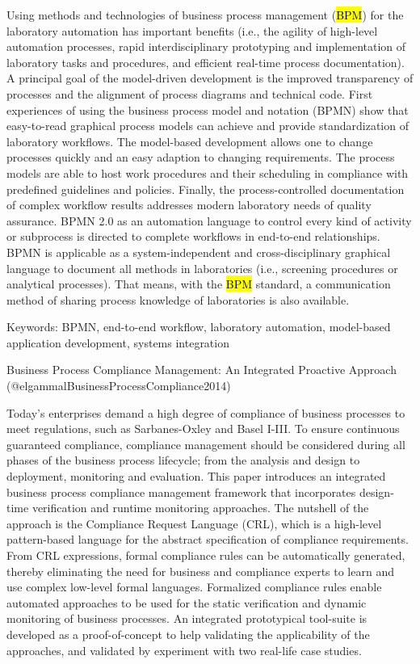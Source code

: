 \documentclass[
  letterpaper,
  DIV=11,
  numbers=noendperiod]{scrartcl}
\begin{document}
Using methods and technologies of business process management (\hl{BPM})
for the laboratory automation has important benefits (i.e., the agility
of high-level automation processes, rapid interdisciplinary prototyping
and implementation of laboratory tasks and procedures, and efficient
real-time process documentation). A principal goal of the model-driven
development is the improved transparency of processes and the alignment
of process diagrams and technical code. First experiences of using the
business process model and notation (BPMN) show that easy-to-read
graphical process models can achieve and provide standardization of
laboratory workflows. The model-based development allows one to change
processes quickly and an easy adaption to changing requirements. The
process models are able to host work procedures and their scheduling in
compliance with predefined guidelines and policies. Finally, the
process-controlled documentation of complex workflow results addresses
modern laboratory needs of quality assurance. BPMN 2.0 as an automation
language to control every kind of activity or subprocess is directed to
complete workflows in end-to-end relationships. BPMN is applicable as a
system-independent and cross-disciplinary graphical language to document
all methods in laboratories (i.e., screening procedures or analytical
processes). That means, with the \hl{BPM} standard, a communication
method of sharing process knowledge of laboratories is also available.

Keywords: BPMN, end-to-end workflow, laboratory automation, model-based
application development, systems integration

Business Process Compliance Management: An Integrated Proactive Approach
(@elgammalBusinessProcessCompliance2014)

Today's enterprises demand a high degree of compliance of business
processes to meet regulations, such as Sarbanes-Oxley and Basel I-III.
To ensure continuous guaranteed compliance, compliance management should
be considered during all phases of the business process lifecycle; from
the analysis and design to deployment, monitoring and evaluation. This
paper introduces an integrated business process compliance management
framework that incorporates design-time verification and runtime
monitoring approaches. The nutshell of the approach is the Compliance
Request Language (CRL), which is a high-level pattern-based language for
the abstract specification of compliance requirements. From CRL
expressions, formal compliance rules can be automatically generated,
thereby eliminating the need for business and compliance experts to
learn and use complex low-level formal languages. Formalized compliance
rules enable automated approaches to be used for the static verification
and dynamic monitoring of business processes. An integrated prototypical
tool-suite is developed as a proof-of-concept to help validating the
applicability of the approaches, and validated by experiment with two
real-life case studies.
\end{document}
